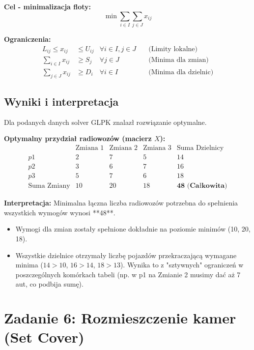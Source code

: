 \documentclass[11pt, a4paper]{article}
\begin{document}
\noindent \textbf{Cel - minimalizacja floty:}
$$ \min \sum_{i \in I} \sum_{j \in J} x_{ij} $$

\noindent \textbf{Ograniczenia:}
\begin{align*}
    L_{ij} \le x_{ij} &\le U_{ij} & \forall i \in I, j \in J \quad &\text{(Limity lokalne)} \\
    \sum_{i \in I} x_{ij} &\ge S_j & \forall j \in J \quad &\text{(Minima dla zmian)} \\
    \sum_{j \in J} x_{ij} &\ge D_i & \forall i \in I \quad &\text{(Minima dla dzielnic)}
\end{align*}

\subsection{Wyniki i interpretacja}
Dla podanych danych solver GLPK znalazł rozwiązanie optymalne.

\noindent \textbf{Optymalny przydział radiowozów (macierz $X$):}
$$
\begin{array}{r|ccc|c}
 & \text{Zmiana 1} & \text{Zmiana 2} & \text{Zmiana 3} & \text{Suma Dzielnicy} \\
\hline
p1 & 2 & 7 & 5 & 14 \\
p2 & 3 & 6 & 7 & 16 \\
p3 & 5 & 7 & 6 & 18 \\
\hline
\text{Suma Zmiany} & 10 & 20 & 18 & \textbf{48 (Całkowita)}
\end{array}
$$

\noindent \textbf{Interpretacja:}
Minimalna łączna liczba radiowozów potrzebna do spełnienia wszystkich wymogów wynosi **48**.
\begin{itemize}
    \item Wymogi dla zmian zostały spełnione dokładnie na poziomie minimów (10, 20, 18).
    \item Wszystkie dzielnice otrzymały liczbę pojazdów przekraczającą wymagane minima ($14 > 10$, $16 > 14$, $18 > 13$). Wynika to z "sztywnych" ograniczeń w poszczególnych komórkach tabeli (np. w p1 na Zmianie 2 musimy dać aż 7 aut, co podbija sumę).
\end{itemize}


\section{Zadanie 6: Rozmieszczenie kamer (Set Cover)}
\end{document}
